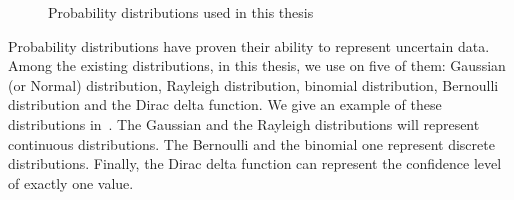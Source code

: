 \begin{figure}
    \centering
    \hfill
    \hfill
    \hfill
    \caption{Probability distributions used in this thesis}
    \label{fig:back:proba:examples}
\end{figure}

Probability distributions have proven their ability to represent uncertain data.
Among the existing distributions, in this thesis, we use on five of them: Gaussian (or Normal) distribution, Rayleigh distribution, binomial distribution, Bernoulli distribution and the Dirac delta function.
We give an example of these distributions in~.
The Gaussian and the Rayleigh distributions will represent continuous distributions.
The Bernoulli and the binomial one represent discrete distributions.
Finally, the Dirac delta function can represent the confidence level of exactly one value.

